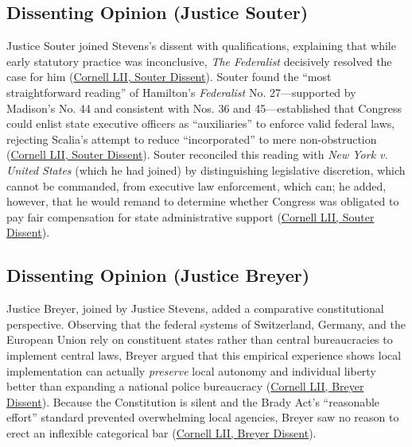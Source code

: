 \documentclass[12pt]{article}
\begin{document}
\subsection{Dissenting Opinion (Justice Souter)}
Justice Souter joined Stevens's dissent with qualifications, explaining that while early statutory practice was inconclusive, \textit{The Federalist} decisively resolved the case for him (\href{https://www.law.cornell.edu/supct/html/95-1478.ZD1.html}{Cornell LII, Souter Dissent}). Souter found the ``most straightforward reading'' of Hamilton's \textit{Federalist} No. 27---supported by Madison's No. 44 and consistent with Nos. 36 and 45---established that Congress could enlist state executive officers as ``auxiliaries'' to enforce valid federal laws, rejecting Scalia's attempt to reduce ``incorporated'' to mere non-obstruction (\href{https://www.law.cornell.edu/supct/html/95-1478.ZD1.html}{Cornell LII, Souter Dissent}). Souter reconciled this reading with \textit{New York v. United States} (which he had joined) by distinguishing legislative discretion, which cannot be commanded, from executive law enforcement, which can; he added, however, that he would remand to determine whether Congress was obligated to pay fair compensation for state administrative support (\href{https://www.law.cornell.edu/supct/html/95-1478.ZD1.html}{Cornell LII, Souter Dissent}).

\subsection{Dissenting Opinion (Justice Breyer)}
Justice Breyer, joined by Justice Stevens, added a comparative constitutional perspective. Observing that the federal systems of Switzerland, Germany, and the European Union rely on constituent states rather than central bureaucracies to implement central laws, Breyer argued that this empirical experience shows local implementation can actually \textit{preserve} local autonomy and individual liberty better than expanding a national police bureaucracy (\href{https://www.law.cornell.edu/supct/html/95-1478.ZD2.html}{Cornell LII, Breyer Dissent}). Because the Constitution is silent and the Brady Act's ``reasonable effort'' standard prevented overwhelming local agencies, Breyer saw no reason to erect an inflexible categorical bar (\href{https://www.law.cornell.edu/supct/html/95-1478.ZD2.html}{Cornell LII, Breyer Dissent}).
\end{document}
